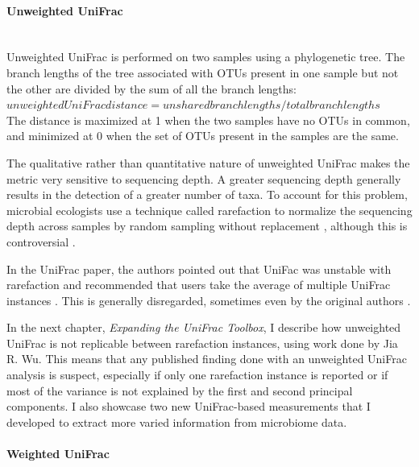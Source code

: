\paragraph{Unweighted UniFrac}\mbox{}\\

Unweighted UniFrac is performed on two samples using a phylogenetic tree. The branch lengths of the tree associated with OTUs present in one sample but not the other are divided by the sum of all the branch lengths:\\

$unweighted UniFrac distance = unshared branch lengths / total branch lengths$\\

The distance is maximized at 1 when the two samples have no OTUs in common, and minimized at 0 when the set of OTUs present in the samples are the same.

The qualitative rather than quantitative nature of unweighted UniFrac makes the metric very sensitive to sequencing depth. A greater sequencing depth generally results in the detection of a greater number of taxa. To account for this problem, microbial ecologists use a technique called rarefaction to normalize the sequencing depth across samples by random sampling without replacement \cite{de2011evaluation}, although this is controversial \cite{mcmurdie2014waste}.

In the UniFrac paper, the authors pointed out that UniFac was unstable with rarefaction and recommended that users take the average of multiple UniFrac instances \cite{lozupone2011unifrac}. This is generally disregarded, sometimes even by the original authors \cite{mckenna2008macaque} \cite{mcnulty2011impact}.

In the next chapter, \textit{Expanding the UniFrac Toolbox}, I describe how unweighted UniFrac is not replicable between rarefaction instances, using work done by Jia R. Wu. This means that any published finding done with an unweighted UniFrac analysis is suspect, especially if only one rarefaction instance is reported or if most of the variance is not explained by the first and second principal components. I also showcase two new UniFrac-based measurements that I developed to extract more varied information from microbiome data.

\FloatBarrier

\paragraph{Weighted UniFrac}\mbox{}\\

